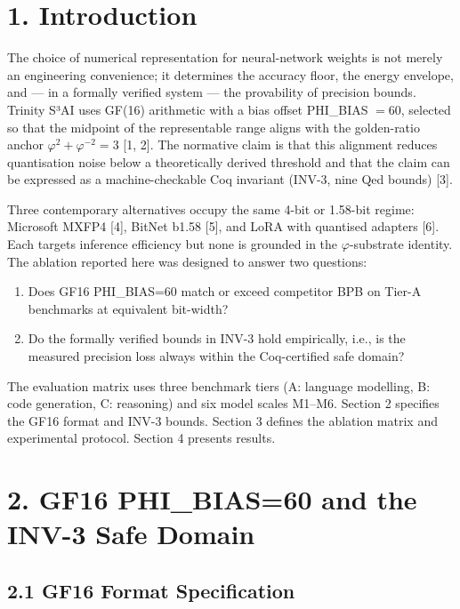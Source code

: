 \section{1. Introduction}\label{fa_09:introduction}

The choice of numerical representation for
neural-network weights is not merely an
engineering convenience; it determines the
accuracy floor, the energy envelope, and --- in a
formally verified system --- the provability of
precision bounds. Trinity S³AI uses GF(16)
arithmetic with a bias offset PHI\_BIAS \(= 60\),
selected so that the midpoint of the representable
range aligns with the golden-ratio anchor
\(\varphi^2 + \varphi^{-2} = 3\) [1, 2]. The
normative claim is that this alignment reduces
quantisation noise below a theoretically derived
threshold and that the claim can be expressed as a
machine-checkable Coq invariant (INV-3, nine Qed
bounds) [3].

Three contemporary alternatives occupy the same
4-bit or 1.58-bit regime: Microsoft MXFP4 [4],
BitNet b1.58 [5], and LoRA with quantised
adapters [6]. Each targets inference
efficiency but none is grounded in the
\(\varphi\)-substrate identity. The ablation
reported here was designed to answer two
questions:

\begin{enumerate}
\def\labelenumi{\arabic{enumi}.}
\tightlist
\item
  Does GF16 PHI\_BIAS=60 match or exceed
  competitor BPB on Tier-A benchmarks at
  equivalent bit-width?
\item
  Do the formally verified bounds in INV-3 hold
  empirically, i.e., is the measured precision
  loss always within the Coq-certified safe
  domain?
\end{enumerate}

The evaluation matrix uses three benchmark tiers
(A: language modelling, B: code generation, C:
reasoning) and six model scales M1--M6. Section 2
specifies the GF16 format and INV-3 bounds.
Section 3 defines the ablation matrix and
experimental protocol. Section 4 presents results.

\section{2. GF16 PHI\_BIAS=60 and the INV-3
Safe
Domain}\label{fa_09:gf16-phi_bias60-and-the-inv-3-safe-domain}

\subsection{2.1 GF16 Format
Specification}\label{fa_09:gf16-format-specification}

